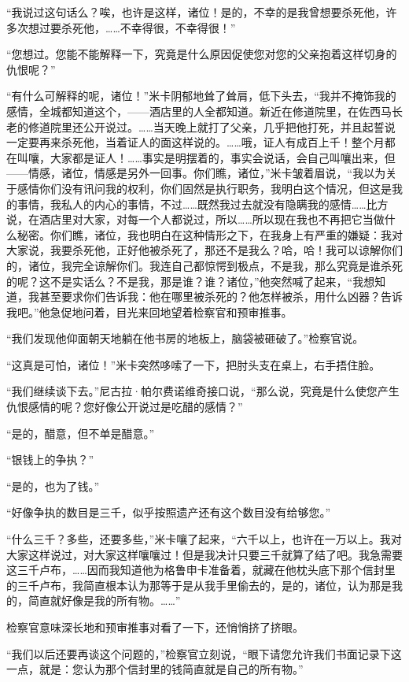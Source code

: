 \par “我说过这句话么？唉，也许是这样，诸位！是的，不幸的是我曾想要杀死他，许多次想过要杀死他，……不幸得很，不幸得很！”
\par “您想过。您能不能解释一下，究竟是什么原因促使您对您的父亲抱着这样切身的仇恨呢？”
\par “有什么可解释的呢，诸位！”米卡阴郁地耸了耸肩，低下头去，“我并不掩饰我的感情，全城都知道这个，——酒店里的人全都知道。新近在修道院里，在佐西马长老的修道院里还公开说过。……当天晚上就打了父亲，几乎把他打死，并且起誓说一定要再来杀死他，当着证人的面这样说的。……哦，证人有成百上千！整个月都在叫嚷，大家都是证人！……事实是明摆着的，事实会说话，会自己叫嚷出来，但——情感，诸位，情感是另外一回事。你们瞧，诸位，”米卡皱着眉说，“我以为关于感情你们没有讯问我的权利，你们固然是执行职务，我明白这个情况，但这是我的事情，我私人的内心的事情，不过……既然我过去就没有隐瞒我的感情……比方说，在酒店里对大家，对每一个人都说过，所以……所以现在我也不再把它当做什么秘密。你们瞧，诸位，我也明白在这种情形之下，在我身上有严重的嫌疑：我对大家说，我要杀死他，正好他被杀死了，那还不是我么？哈，哈！我可以谅解你们的，诸位，我完全谅解你们。我连自己都惊愕到极点，不是我，那么究竟是谁杀死的呢？这不是实话么？不是我，那是谁？谁？诸位，”他突然喊了起来，“我想知道，我甚至要求你们告诉我：他在哪里被杀死的？他怎样被杀，用什么凶器？告诉我吧。”他急促地问着，目光来回地望着检察官和预审推事。
\par “我们发现他仰面朝天地躺在他书房的地板上，脑袋被砸破了。”检察官说。
\par “这真是可怕，诸位！”米卡突然哆嗦了一下，把肘头支在桌上，右手捂住脸。
\par “我们继续谈下去。”尼古拉·帕尔费诺维奇接口说，“那么说，究竟是什么使您产生仇恨感情的呢？您好像公开说过是吃醋的感情？”
\par “是的，醋意，但不单是醋意。”
\par “银钱上的争执？”
\par “是的，也为了钱。”
\par “好像争执的数目是三千，似乎按照遗产还有这个数目没有给够您。”
\par “什么三千？多些，还要多些，”米卡嚷了起来，“六千以上，也许在一万以上。我对大家这样说过，对大家这样嚷嚷过！但是我决计只要三千就算了结了吧。我急需要这三千卢布，……因而我知道他为格鲁申卡准备着，就藏在他枕头底下那个信封里的三千卢布，我简直根本认为那等于是从我手里偷去的，是的，诸位，认为那是我的，简直就好像是我的所有物。……”
\par 检察官意味深长地和预审推事对看了一下，还悄悄挤了挤眼。
\par “我们以后还要再谈这个问题的，”检察官立刻说，“眼下请您允许我们书面记录下这一点，就是：您认为那个信封里的钱简直就是自己的所有物。”
